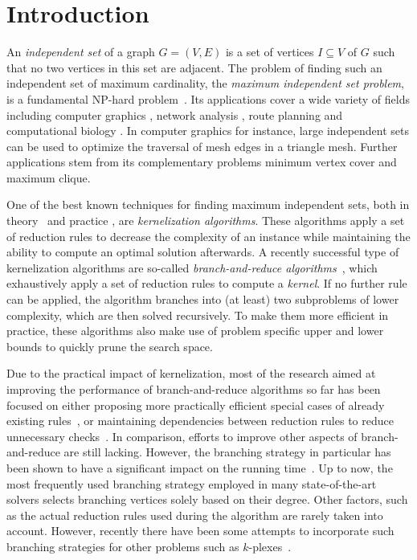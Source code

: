 \documentclass[a4paper,UKenglish,cleveref, autoref, thm-restate]{lipics-v2021}
\begin{document}
\newpage

\section{Introduction}

An \emph{independent set} of a graph $G = (V,E)$ is a set of vertices $I \subseteq V$ of $G$ such that no two vertices in this set are adjacent.
The problem of finding such an independent set of maximum cardinality, the \emph{maximum independent set problem}, is a fundamental NP-hard problem~\cite{Garey1974}.
Its applications cover a wide variety of fields including computer graphics \cite{CG}, network analysis \cite{NW}, route planning \cite{RP} and computational biology \cite{BIO1, BIO2}.
In computer graphics for instance, large independent sets can be used to optimize the traversal of mesh edges in a triangle mesh.
Further applications stem from its complementary problems minimum vertex cover and maximum clique.

One of the best known techniques for finding maximum independent sets, both in theory~\cite{XiaoNagamochi, ChenXiaKanj} and practice \cite{AkibaIwata}, are \emph{kernelization algorithms}.
These algorithms apply a set of reduction rules to decrease the complexity of an instance while maintaining the ability to compute an optimal solution afterwards.
A recently successful type of kernelization algorithms are so-called \emph{branch-and-reduce algorithms}~\cite{AkibaIwata,WGYC}, which exhaustively apply a set of reduction rules to compute a \emph{kernel}.
If no further rule can be applied, the algorithm branches into (at least) two subproblems of lower complexity, which are then solved recursively.
To make them more efficient in practice, these algorithms also make use of problem specific upper and lower bounds to quickly prune the search space.

Due to the practical impact of kernelization, most of the research aimed at improving the performance of branch-and-reduce algorithms so far has been focused on either proposing more practically efficient special cases of already existing rules~\cite{ChangKern,dahlum2016accelerating}, or maintaining dependencies between reduction rules to reduce unnecessary checks~\cite{alsahafy2020computing,hespe2019scalable}.
In comparison, efforts to improve other aspects of branch-and-reduce are still lacking.
However, the branching strategy in particular has been shown to have a significant impact on the running time~\cite{AkibaIwata}.
Up to now, the most frequently used branching strategy employed in many state-of-the-art solvers selects branching vertices solely based on their degree.
Other factors, such as the actual reduction rules used during the algorithm are rarely taken into account.
However, recently there have been some attempts to incorporate such branching strategies for other problems such as $k$-plexes~\cite{gao2018exact}.
\end{document}
